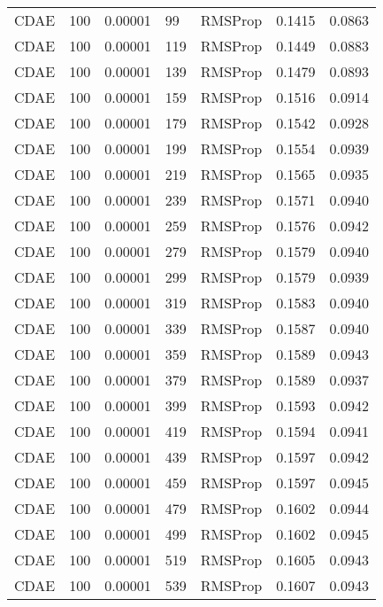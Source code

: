 \begin{tabular}{llrllrr}
    CDAE &  100 &  0.00001 &    99 &   RMSProp &  0.1415 &       0.0863 \\
    CDAE &  100 &  0.00001 &   119 &   RMSProp &  0.1449 &       0.0883 \\
    CDAE &  100 &  0.00001 &   139 &   RMSProp &  0.1479 &       0.0893 \\
    CDAE &  100 &  0.00001 &   159 &   RMSProp &  0.1516 &       0.0914 \\
    CDAE &  100 &  0.00001 &   179 &   RMSProp &  0.1542 &       0.0928 \\
    CDAE &  100 &  0.00001 &   199 &   RMSProp &  0.1554 &       0.0939 \\
    CDAE &  100 &  0.00001 &   219 &   RMSProp &  0.1565 &       0.0935 \\
    CDAE &  100 &  0.00001 &   239 &   RMSProp &  0.1571 &       0.0940 \\
    CDAE &  100 &  0.00001 &   259 &   RMSProp &  0.1576 &       0.0942 \\
    CDAE &  100 &  0.00001 &   279 &   RMSProp &  0.1579 &       0.0940 \\
    CDAE &  100 &  0.00001 &   299 &   RMSProp &  0.1579 &       0.0939 \\
    CDAE &  100 &  0.00001 &   319 &   RMSProp &  0.1583 &       0.0940 \\
    CDAE &  100 &  0.00001 &   339 &   RMSProp &  0.1587 &       0.0940 \\
    CDAE &  100 &  0.00001 &   359 &   RMSProp &  0.1589 &       0.0943 \\
    CDAE &  100 &  0.00001 &   379 &   RMSProp &  0.1589 &       0.0937 \\
    CDAE &  100 &  0.00001 &   399 &   RMSProp &  0.1593 &       0.0942 \\
    CDAE &  100 &  0.00001 &   419 &   RMSProp &  0.1594 &       0.0941 \\
    CDAE &  100 &  0.00001 &   439 &   RMSProp &  0.1597 &       0.0942 \\
    CDAE &  100 &  0.00001 &   459 &   RMSProp &  0.1597 &       0.0945 \\
    CDAE &  100 &  0.00001 &   479 &   RMSProp &  0.1602 &       0.0944 \\
    CDAE &  100 &  0.00001 &   499 &   RMSProp &  0.1602 &       0.0945 \\
    CDAE &  100 &  0.00001 &   519 &   RMSProp &  0.1605 &       0.0943 \\
    CDAE &  100 &  0.00001 &   539 &   RMSProp &  0.1607 &       0.0943 \\

\end{tabular}
